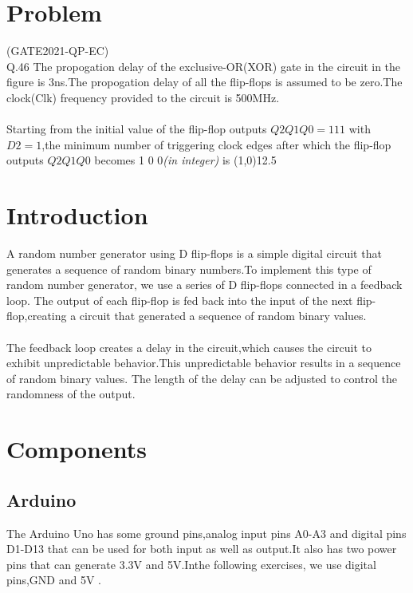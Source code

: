 \documentclass[10pt,a4paper]{article}
\title{\mytitle}
\author{MARIKUNDAM HARSHITHA\\marikundamdec@gmail.com\\FWC22120 IITH-Future Wireless Communications     Assignment-1}
\date{}
\begin{document}
\maketitle
\tableofcontents

\section{Problem}
(GATE2021-QP-EC)\\
Q.46 The propogation delay of the exclusive-OR(XOR) gate in the circuit in the figure is 3ns.The propogation delay of all the flip-flops is assumed to be zero.The clock(Clk) frequency provided to the circuit is 500MHz.\\
\\
Starting from the initial value of the flip-flop outputs $Q2Q1Q0 =111$ with $D2=1$,the minimum number of triggering clock edges after which the flip-flop outputs $Q2Q1Q0$ becomes 1 0 0\emph{(in integer)} is \line(1,0){12.5}

\section{Introduction}
A random number generator using D flip-flops is a simple digital circuit that generates a sequence of random binary numbers.To implement this type of random number generator, we use a series of D flip-flops connected in a feedback loop. The output of each flip-flop is fed back into the input of the next flip-flop,creating a circuit that generated a sequence of random binary values.\\ \\
The feedback loop creates a delay in the circuit,which causes the circuit to exhibit unpredictable behavior.This unpredictable behavior results in a sequence of random binary values. The length of the delay can be adjusted to control the randomness of the output.

\section{Components}

\subsection{Arduino} 
The Arduino Uno has some ground pins,analog input pins A0-A3 and digital pins D1-D13 that can be used for both input as well as output.It also has two power pins that can generate 3.3V and 5V.Inthe following exercises, we use digital pins,GND and 5V .
\end{document}

